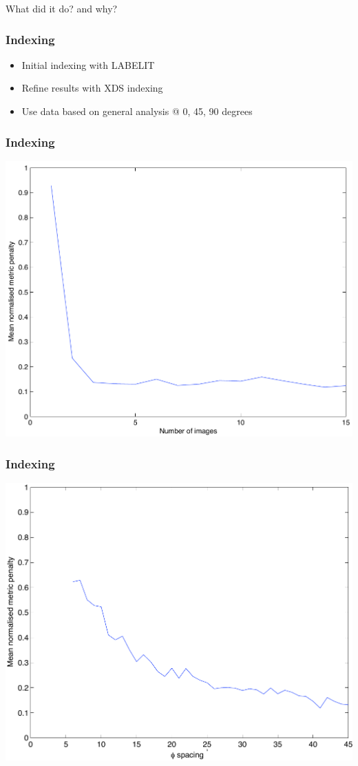 \documentclass[slides,compress]{beamer}
\begin{document}
\begin{frame}
\begin{center}
\Huge What did it do? and why?
\end{center}
\end{frame}

\begin{frame}
\frametitle{Indexing}
\begin{itemize}
\item{Initial indexing with LABELIT}
\item{Refine results with XDS indexing}
\item{Use data based on general analysis @ 0, 45, 90 degrees}
\end{itemize}
\end{frame}

\begin{frame}
\frametitle{Indexing}
\hspace{3cm}
\includegraphics[scale=0.5]{figures/no_images.pdf}
\end{frame}

\begin{frame}
\frametitle{Indexing}
\hspace{3cm}
\includegraphics[scale=0.5]{figures/phi_spacing_45a.pdf}
\end{frame}
\end{document}
